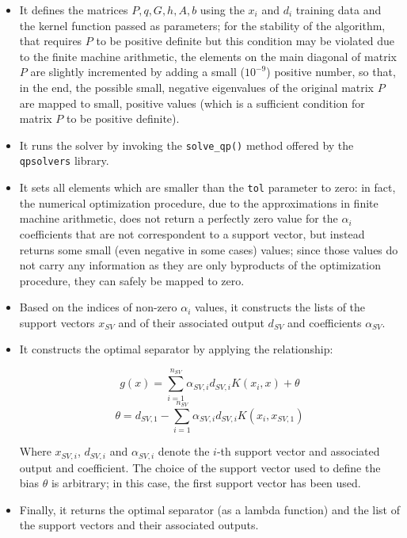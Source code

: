\documentclass[letterpaper,headings=standardclasses]{scrartcl}
\begin{document}
\begin{itemize}
    \item It defines the matrices $P, q, G, h, A, b$ using the $x_i$ and $d_i$ training data and the kernel function passed as parameters; for the stability of the algorithm, that requires $P$ to be positive definite but this condition may be violated due to the finite machine arithmetic, the elements on the main diagonal of matrix $P$ are slightly incremented by adding a small ($10^{-9}$) positive number, so that, in the end, the possible small, negative eigenvalues of the original matrix $P$ are mapped to small, positive values (which is a sufficient condition for matrix $P$ to be positive definite).
    
    \item It runs the solver by invoking the \texttt{solve\_qp()} method offered by the \texttt{qpsolvers} library.
    
    \item It sets all elements which are smaller than the \texttt{tol} parameter to zero: in fact, the numerical optimization procedure, due to the approximations in finite machine arithmetic, does not return a perfectly zero value for the $\alpha_i$ coefficients that are not correspondent to a support vector, but instead returns some small (even negative in some cases) values; since those values do not carry any information as they are only byproducts of the optimization procedure, they can safely be mapped to zero.
    
    \item Based on the indices of non-zero $\alpha_i$ values, it constructs the lists of the support vectors $x_{SV}$ and of their associated output $d_{SV}$ and coefficients $\alpha_{SV}$.
    
    \item It constructs the optimal separator by applying the relationship:
    
    $$ g(x) = \sum_{i = 1}^{n_{SV}} \alpha_{SV,i} d_{SV,i} K(x_i, x) + \theta $$
    $$ \theta = d_{SV,1} - \sum_{i = 1}^{n_{SV}} \alpha_{SV,i} d_{SV,i} K(x_i, x_{SV,1}) $$

    Where $x_{SV,i}$, $d_{SV,i}$ and $\alpha_{SV,i}$ denote the $i$-th support vector and associated output and coefficient. The choice of the support vector used to define the bias $\theta$ is arbitrary; in this case, the first support vector has been used.

    \item Finally, it returns the optimal separator (as a lambda function) and the list of the support vectors and their associated outputs.
\end{itemize}
\end{document}
